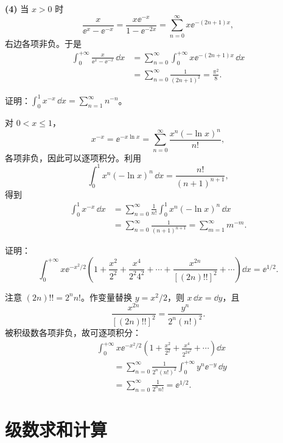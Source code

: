\begin{xsolution}
\textbf{(4)}\quad
当 $x>0$ 时
\[
  \frac{x}{\ee^x-\ee^{-x}}
  =\frac{x\ee^{-x}}{1-\ee^{-2x}}
  =\sum_{n=0}^{\infty}x\ee^{-(2n+1)x},
\]
右边各项非负。于是
\[
\begin{aligned}
  \int_0^{+\infty}\frac{x}{\ee^x-\ee^{-x}}\,\dd x
  &=\sum_{n=0}^{\infty}\int_0^{+\infty}x\ee^{-(2n+1)x}\,\dd x\\
  &=\sum_{n=0}^{\infty}\frac1{(2n+1)^2}
  =\frac{\pi^2}{8}.
\end{aligned}
\]
\end{xsolution}


\begin{xexercise}[4]
证明：$\displaystyle \int_0^1x^{-x}\,\dd x=\sum_{n=1}^{\infty}n^{-n}$。
\end{xexercise}
\begin{xsolution}
对 $0<x\leqslant1$，
\[
  x^{-x}=\ee^{-x\ln x}
  =\sum_{n=0}^{\infty}\frac{x^n(-\ln x)^n}{n!},
\]
各项非负，因此可以逐项积分。利用
\[
  \int_0^1x^n(-\ln x)^n\,\dd x
  =\frac{n!}{(n+1)^{n+1}},
\]
得到
\[
\begin{aligned}
  \int_0^1x^{-x}\,\dd x
  &=\sum_{n=0}^{\infty}\frac1{n!}
    \int_0^1x^n(-\ln x)^n\,\dd x\\
  &=\sum_{n=0}^{\infty}\frac1{(n+1)^{n+1}}
  =\sum_{m=1}^{\infty}m^{-m}.
\end{aligned}
\]
\end{xsolution}


\begin{xexercise}[5]
证明：
\[
  \int_0^{+\infty}x\ee^{-x^2/2}
  \left(1+\frac{x^2}{2^2}+\frac{x^4}{2^2 4^2}+\cdots
  +\frac{x^{2n}}{[(2n)!!]^2}+\cdots\right)\dd x=\ee^{1/2}.
\]
\end{xexercise}
\begin{xsolution}
注意 $(2n)!!=2^nn!$。作变量替换 $y=x^2/2$，则 $x\,\dd x=\dd y$，且
\[
  \frac{x^{2n}}{[(2n)!!]^2}
  =\frac{y^n}{2^n(n!)^2}.
\]
被积级数各项非负，故可逐项积分：
\[
\begin{aligned}
&\int_0^{+\infty}x\ee^{-x^2/2}
  \left(1+\frac{x^2}{2^2}+\frac{x^4}{2^24^2}+\cdots\right)\dd x\\
&\qquad=\sum_{n=0}^{\infty}\frac1{2^n(n!)^2}
  \int_0^{+\infty}y^n\ee^{-y}\,\dd y\\
&\qquad=\sum_{n=0}^{\infty}\frac1{2^nn!}
  =\ee^{1/2}.
\end{aligned}
\]
\end{xsolution}


\section{级数求和计算}

